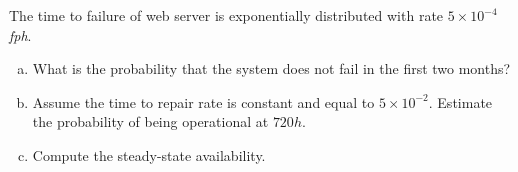 \documentclass{article}
\begin{document}
\begin{question}
	The time to failure of web server is exponentially distributed with rate \( 5 \times 10^{-4} \) \textit{fph}. 
    \begin{enumerate}[(a)]
    \item What is the probability that the system does not fail in the first two months? 
    \item Assume the time to repair rate is constant and equal to \( 5 \times 10^{-2} \). Estimate the probability of being operational at \( 720h \).
    \item Compute the steady-state availability.
    \end{enumerate}
\end{question}
\end{document}
